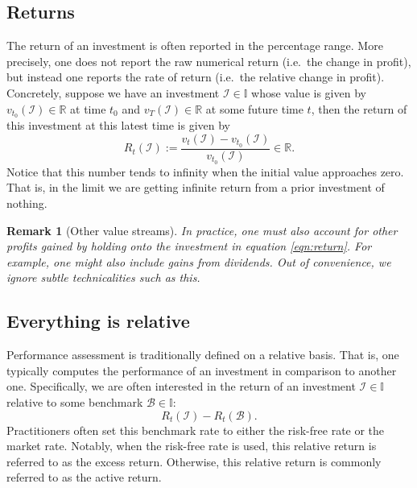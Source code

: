 \documentclass[12pt]{article}
\newtheorem{remark}{Remark}[section]
\begin{document}
\subsection{Returns}
The return of an investment is often reported in the percentage range. More precisely, one does not report the raw numerical return (i.e.\ the change in profit), but instead one reports the rate of return (i.e.\ the relative change in profit). Concretely, suppose we have an investment $\mathcal{I} \in \mathbb{I}$ whose value is given by $v_{t_0}(\mathcal{I}) \in \mathbb{R}$ at time $t_0$ and $v_T(\mathcal{I}) \in \mathbb{R}$ at some future time $t$, then the return of this investment at this latest time is given by
\begin{equation}
    R_t(\mathcal{I}) := \frac{v_t(\mathcal{I}) - v_{t_0}(\mathcal{I})}{v_{t_0}(\mathcal{I})} \in \mathbb{R}.
    \label{eqn:return}
\end{equation}
Notice that this number tends to infinity when the initial value approaches zero. That is, in the limit we are getting infinite return from a prior investment of nothing.

\begin{remark}
	[Other value streams] In practice, one must also account for other profits gained by holding onto the investment in equation \eqref{eqn:return}. For example, one might also include gains from dividends. Out of convenience, we ignore subtle technicalities such as this.
\end{remark}

\subsection{Everything is relative}
Performance assessment is traditionally defined on a relative basis. That is, one typically computes the performance of an investment in comparison to another one. Specifically, we are often interested in the return of an investment $\mathcal{I} \in \mathbb{I}$ relative to some benchmark $\mathcal{B} \in \mathbb{I}$:
\begin{equation}
    R_t(\mathcal{I}) - R_t(\mathcal{B}).
    \label{eqn:relative_return}
\end{equation}
Practitioners often set this benchmark rate to either the risk-free rate or the market rate. Notably, when the risk-free rate is used, this relative return is referred to as the excess return. Otherwise, this relative return is commonly referred to as the active return.
\end{document}
